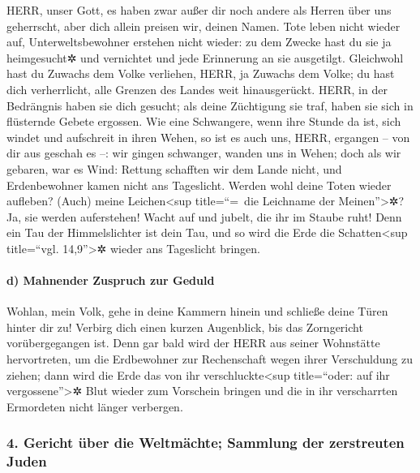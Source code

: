 HERR, unser Gott, es haben zwar außer dir noch andere als
Herren über uns geherrscht, aber dich allein preisen wir, deinen Namen.
Tote leben nicht wieder auf, Unterweltsbewohner erstehen
nicht wieder: zu dem Zwecke hast du sie ja heimgesucht✲ und vernichtet
und jede Erinnerung an sie ausgetilgt. Gleichwohl hast du
Zuwachs dem Volke verliehen, HERR, ja Zuwachs dem Volke; du hast dich
verherrlicht, alle Grenzen des Landes weit hinausgerückt.
HERR, in der Bedrängnis haben sie dich gesucht; als deine
Züchtigung sie traf, haben sie sich in flüsternde Gebete ergossen.
Wie eine Schwangere, wenn ihre Stunde da ist, sich windet
und aufschreit in ihren Wehen, so ist es auch uns, HERR, ergangen -- von
dir aus geschah es --: wir gingen schwanger, wanden uns
in Wehen; doch als wir gebaren, war es Wind: Rettung schafften wir dem
Lande nicht, und Erdenbewohner kamen nicht ans Tageslicht.
Werden wohl deine Toten wieder aufleben? (Auch) meine
Leichen\textless sup title=``=~die Leichname der Meinen''\textgreater✲?
Ja, sie werden auferstehen! Wacht auf und jubelt, die ihr im Staube
ruht! Denn ein Tau der Himmelslichter ist dein Tau, und so wird die Erde
die Schatten\textless sup title=``vgl. 14,9''\textgreater✲ wieder ans
Tageslicht bringen.

\hypertarget{d-mahnender-zuspruch-zur-geduld}{%
\paragraph{d) Mahnender Zuspruch zur
Geduld}\label{d-mahnender-zuspruch-zur-geduld}}

Wohlan, mein Volk, gehe in deine Kammern hinein und
schließe deine Türen hinter dir zu! Verbirg dich einen kurzen
Augenblick, bis das Zorngericht vorübergegangen ist. Denn
gar bald wird der HERR aus seiner Wohnstätte hervortreten, um die
Erdbewohner zur Rechenschaft wegen ihrer Verschuldung zu ziehen; dann
wird die Erde das von ihr verschluckte\textless sup title=``oder: auf
ihr vergossene''\textgreater✲ Blut wieder zum Vorschein bringen und die
in ihr verscharrten Ermordeten nicht länger verbergen.

\hypertarget{gericht-uxfcber-die-weltmuxe4chte-sammlung-der-zerstreuten-juden}{%
\subsubsection{4. Gericht über die Weltmächte; Sammlung der zerstreuten
Juden}\label{gericht-uxfcber-die-weltmuxe4chte-sammlung-der-zerstreuten-juden}}

